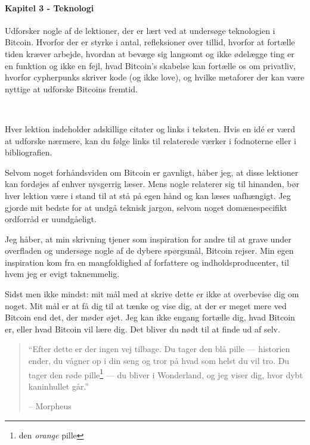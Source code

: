 \paragraph{Kapitel 3 - Teknologi} 
Udforsker nogle af de lektioner, der er lært ved at undersøge teknologien i 
Bitcoin. Hvorfor der er styrke i antal, refleksioner over tillid, hvorfor at 
fortælle tiden kræver arbejde, hvordan at bevæge sig langsomt og ikke ødelægge 
ting er en funktion og ikke en fejl, hvad Bitcoin's skabelse kan fortælle os 
om privatliv, hvorfor cypherpunks skriver kode (og ikke love), og hvilke 
metaforer der kan være nyttige at udforske Bitcoins fremtid.

~

Hver lektion indeholder adskillige citater og links i teksten. Hvis en idé er
værd at udforske nærmere, kan du følge links til relaterede værker i
fodnoterne eller i bibliografien.

Selvom noget forhåndsviden om Bitcoin er gavnligt, håber jeg, at disse
lektioner kan fordøjes af enhver nysgerrig læser. Mens nogle relaterer sig til 
hinanden, bør hver lektion være i stand til at stå på egen hånd og kan læses 
uafhængigt. Jeg gjorde mit bedste for at undgå teknisk jargon, selvom noget 
domænespecifikt ordforråd er uundgåeligt.

Jeg håber, at min skrivning tjener som inspiration for andre til at grave under
overfladen og undersøge nogle af de dybere spørgsmål, Bitcoin rejser. Min egen
inspiration kom fra en mangfoldighed af forfattere og indholdsproducenter, til 
hvem jeg er evigt taknemmelig.

Sidst men ikke mindst: mit mål med at skrive dette er ikke at overbevise dig om 
noget. Mit mål er at få dig til at tænke og vise dig, at der er meget mere ved 
Bitcoin end det, der møder øjet. Jeg kan ikke engang fortælle dig, hvad Bitcoin 
er, eller hvad Bitcoin vil lære dig. Det bliver du nødt til at finde ud af selv.

\begin{quotation}\begin{samepage}
\enquote{Efter dette er der ingen vej tilbage. Du tager den blå pille --- 
historien ender, du vågner op i din seng og tror på hvad som helst du vil tro. 
Du tager den røde pille\footnote{den \textit{orange} pille} --- du bliver i 
Wonderland, og jeg viser dig, hvor dybt kaninhullet går.}
\begin{flushright} -- Morpheus
\end{flushright}\end{samepage}\end{quotation}

